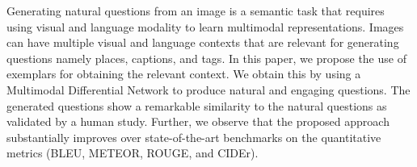 Generating natural questions from an image is a semantic task that requires using visual and language modality to learn multimodal representations. Images can have multiple visual and language contexts that are relevant for generating questions namely places, captions, and tags. In this paper, we propose the use of exemplars for obtaining the relevant context. We obtain this by using a Multimodal Differential Network to produce natural and engaging questions. The generated questions show a remarkable similarity to the natural questions as validated by a human study. Further, we observe that the proposed approach substantially improves over state-of-the-art benchmarks on the quantitative metrics (BLEU, METEOR, ROUGE, and CIDEr).
